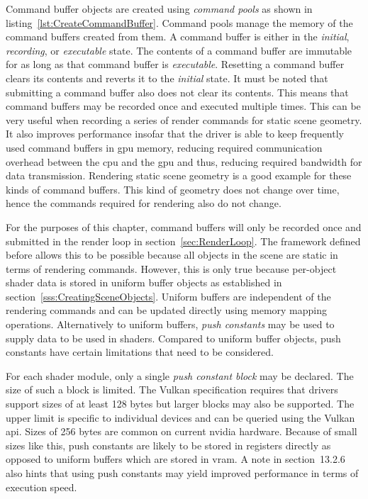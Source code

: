    Command buffer objects are created using \textit{command pools} as shown in listing~\ref{lst:CreateCommandBuffer}.
    Command pools manage the memory of the command buffers created from them.
    A command buffer is either in the \textit{initial}, \textit{recording}, or \textit{executable} state.
    The contents of a command buffer are immutable for as long as that command buffer is \textit{executable}.
    Resetting a command buffer clears its contents and reverts it to the \textit{initial} state.
    It must be noted that submitting a command buffer also does not clear its contents.
    This means that command buffers may be recorded once and executed multiple times.
    This can be very useful when recording a series of render commands for static scene geometry.
    It also improves performance insofar that the \gls{driver} is able to keep frequently used command buffers in \gls{gpu} memory, reducing required communication overhead between the \gls{cpu} and the \gls{gpu} and thus, reducing required bandwidth for data transmission.
    Rendering static scene geometry is a good example for these kinds of command buffers.
    This kind of geometry does not change over time, hence the commands required for rendering also do not change.

    For the purposes of this chapter, command buffers will only be recorded once and submitted in the render loop in section~\ref{sec:RenderLoop}.
    The framework defined before allows this to be possible because all objects in the scene are static in terms of rendering commands.
    However, this is only true because per-object shader data is stored in uniform buffer objects as established in section~\ref{sss:CreatingSceneObjects}.
    Uniform buffers are independent of the rendering commands and can be updated directly using memory mapping operations.
    Alternatively to uniform buffers, \textit{push constants} may be used to supply data to be used in shaders.
    Compared to uniform buffer objects, push constants have certain limitations that need to be considered.

    For each shader module, only a single \textit{push constant block} may be declared.
    The size of such a block is limited.
    The Vulkan specification requires that \glspl{driver} support sizes of at least 128 bytes but larger blocks may also be supported.
    The upper limit is specific to individual devices and can be queried using the Vulkan \gls{api}.
    Sizes of 256 bytes are common on current \gls{nvidia} hardware.
    Because of small sizes like this, push constants are likely to be stored in registers directly as opposed to uniform buffers which are stored in \gls{vram}.
    A note in section~13.2.6 also hints that using push constants may yield improved performance in terms of execution speed.

